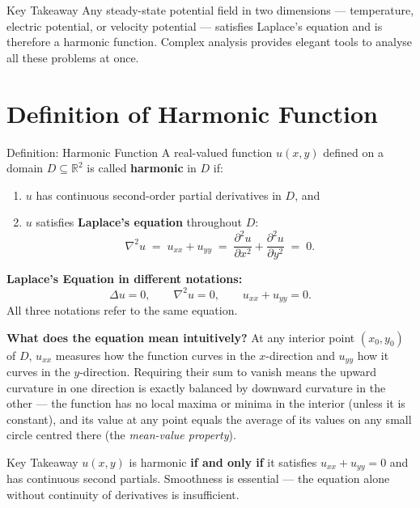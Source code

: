 \documentclass[12pt,a4paper]{article}
\begin{document}
\begin{learnbox}{Key Takeaway}
Any steady-state potential field in two dimensions --- temperature, electric potential, or velocity
potential --- satisfies Laplace's equation and is therefore a harmonic function. Complex analysis
provides elegant tools to analyse all these problems at once.
\end{learnbox}

\section{Definition of Harmonic Function}

\begin{infobox}{Definition: Harmonic Function}
A real-valued function $u(x,y)$ defined on a domain $D \subseteq \mathbb{R}^{2}$ is called
\textbf{harmonic} in $D$ if:
\begin{enumerate}[label=(\roman*)]
  \item $u$ has continuous second-order partial derivatives in $D$, and
  \item $u$ satisfies \textbf{Laplace's equation} throughout $D$:
  \[
    \nabla^{2} u \;=\; u_{xx}+u_{yy} \;=\; \frac{\partial^{2} u}{\partial x^{2}}
    + \frac{\partial^{2} u}{\partial y^{2}} \;=\; 0.
  \]
\end{enumerate}

\medskip
\textbf{Laplace's Equation in different notations:}
\[
  \Delta u = 0, \qquad \nabla^{2} u = 0, \qquad u_{xx}+u_{yy}=0.
\]
All three notations refer to the same equation.
\end{infobox}

\medskip

\textbf{What does the equation mean intuitively?} At any interior point $(x_{0},y_{0})$ of $D$,
$u_{xx}$ measures how the function curves in the $x$-direction and $u_{yy}$ how it curves in the
$y$-direction. Requiring their sum to vanish means the upward curvature in one direction is
exactly balanced by downward curvature in the other --- the function has no local maxima or minima
in the interior (unless it is constant), and its value at any point equals the average of its
values on any small circle centred there (the \emph{mean-value property}).

\begin{learnbox}{Key Takeaway}
$u(x,y)$ is harmonic \textbf{if and only if} it satisfies $u_{xx}+u_{yy}=0$ and has continuous
second partials. Smoothness is essential --- the equation alone without continuity of derivatives
is insufficient.
\end{learnbox}
\end{document}
